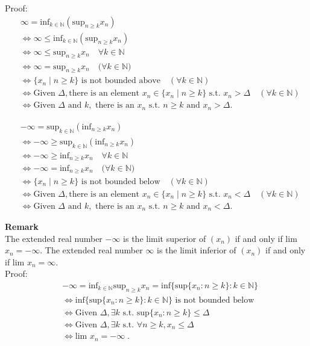 \documentclass[a4paper]{article}
\begin{document}
Proof:
\begin{align*}
&\infty = \text{inf}_{k \in \mathbb{N}}(\text{sup}_{n\geq k} x_n) \\
&\iff \infty \leq \text{inf}_{k \in \mathbb{N}}(\text{sup}_{n\geq k} x_n)\\
&\iff \infty \leq \text{sup}_{n\geq k} x_n   \quad \forall k \in \mathbb{N}\\
&\iff \infty=\text{sup}_{n\geq k} x_n  \quad (\forall k \in \mathbb{N)}\\
&\iff \{x_n \;|\; n\geq k\} \text{ is not bounded above} \quad (\forall k \in \mathbb{N})\\
&\iff \text{Given } \Delta, \text{there is an element } x_n \in \{x_n \;|\; n\geq k\} \text{ s.t. } x_n> \Delta \quad (\forall k \in \mathbb{N})\\
&\iff \text{Given }\Delta \text{ and } k, \text{ there is an } x_n \text{ s.t. } n\geq k \text{ and } x_n > \Delta.
\end{align*}

\begin{align*}
&-\infty = \text{sup}_{k \in \mathbb{N}}(\text{inf}_{n\geq k} x_n) \\
&\iff -\infty \geq \text{sup}_{k \in \mathbb{N}}(\text{inf}_{n\geq k} x_n)\\
&\iff -\infty \geq \text{inf}_{n\geq k} x_n   \quad \forall k \in \mathbb{N}\\
&\iff -\infty=\text{inf}_{n\geq k} x_n  \quad (\forall k \in \mathbb{N)}\\
&\iff \{x_n \;|\; n\geq k\} \text{ is not bounded below} \quad (\forall k \in \mathbb{N})\\
&\iff \text{Given } \Delta, \text{there is an element } x_n \in \{x_n \;|\; n\geq k\} \text{ s.t. } x_n< \Delta \quad (\forall k \in \mathbb{N})\\
&\iff \text{Given }\Delta \text{ and } k, \text{ there is an } x_n \text{ s.t. } n\geq k \text{ and } x_n < \Delta.
\end{align*}

{\bf Remark}\\
The extended real number $-\infty$ is the limit superior of $(x_n)$ if and only if lim $x_n = -\infty$. The extended real number $\infty$ is the limit inferior of $(x_n)$ if and only if lim $x_n = \infty$.\\

Proof:\\

\begin{align*}
&-\infty = \text{inf}_{k\in \mathbb{N}}\text{sup}_{n\geq k} x_n = \text{inf}\{\text{sup} \{x_n : n \geq k\} : k \in \mathbb{N}\}\\
&\iff \text{inf}\{\text{sup} \{x_n : n \geq k\} : k \in \mathbb{N}\} \text{ is not bounded below}\\
&\iff \text{Given } \Delta, \exists k \text{ s.t. } \text{sup}\{x_n : n \geq k\} \leq \Delta\\
&\iff \text{Given } \Delta, \exists k \text{ s.t. } \forall n\geq k, x_n \leq \Delta \\
&\iff \text{lim } x_n = -\infty\;.
\end{align*}
\end{document}

